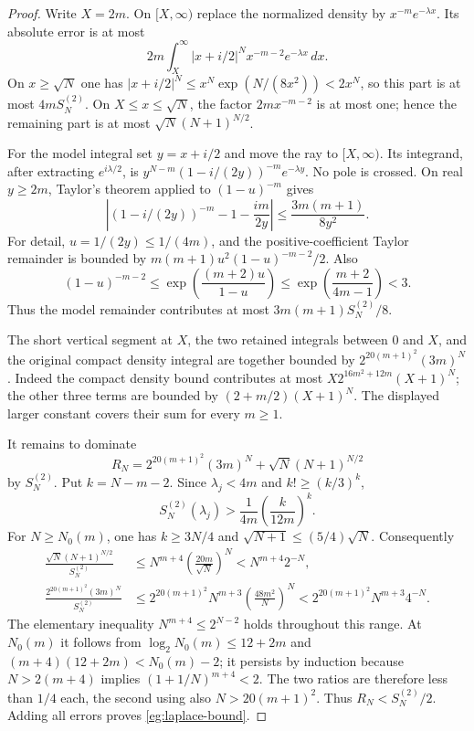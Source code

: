 \documentclass[11pt,a4paper]{article}
\numberwithin{equation}{section}
\theoremstyle{definition}
\theoremstyle{remark}
\begin{document}
\begin{proof}
Write $X=2m$.  On $[X,\infty)$ replace the normalized density
by $x^{-m}e^{-\lambda x}$.  Its absolute error is at most
\[
 2m\int_X^\infty |x+i/2|^Nx^{-m-2}e^{-\lambda x}\,dx.
\]
On $x\ge\sqrt N$ one has
$|x+i/2|^N\le x^N\exp(N/(8x^2))<2x^N$, so this part is
at most $4mS_N^{(2)}$.  On $X\le x\le\sqrt N$, the factor
$2mx^{-m-2}$ is at most one; hence the remaining part is at most
$\sqrt N(N+1)^{N/2}$.

For the model integral set $y=x+i/2$ and move the ray to
$[X,\infty)$.  Its integrand, after extracting $e^{i\lambda/2}$,
is $y^{N-m}(1-i/(2y))^{-m}e^{-\lambda y}$.  No pole is crossed.
On real $y\ge2m$, Taylor's theorem applied to $(1-u)^{-m}$ gives
\[
 \left|(1-i/(2y))^{-m}-1-\frac{im}{2y}\right|
       \le\frac{3m(m+1)}{8y^2}.
\]
For detail, $u=1/(2y)\le1/(4m)$, and the positive-coefficient
Taylor remainder is bounded by
$m(m+1)u^2(1-u)^{-m-2}/2$.  Also
\[
 (1-u)^{-m-2}\le
  \exp\!\left(\frac{(m+2)u}{1-u}\right)
  \le\exp\!\left(\frac{m+2}{4m-1}\right)<3.
\]
Thus the model remainder contributes at most
$3m(m+1)S_N^{(2)}/8$.

The short vertical segment at $X$, the two retained integrals
between $0$ and $X$, and the original compact density integral
are together bounded by $2^{20(m+1)^2}(3m)^N$.  Indeed the
compact density bound contributes at most
$X2^{16m^2+12m}(X+1)^N$; the other three terms are bounded
by $(2+m/2)(X+1)^N$.  The displayed larger constant covers their
sum for every $m\ge1$.

It remains to dominate
\[
 R_N=2^{20(m+1)^2}(3m)^N+\sqrt N(N+1)^{N/2}
\]
by $S_N^{(2)}$.  Put $k=N-m-2$.  Since $\lambda_j<4m$ and
$k!\ge(k/3)^k$,
\[
 S_N^{(2)}(\lambda_j)>
             \frac1{4m}\left(\frac{k}{12m}\right)^k.
\]
For $N\ge N_0(m)$, one has $k\ge3N/4$ and
$\sqrt{N+1}\le(5/4)\sqrt N$.  Consequently
\begin{align*}
 \frac{\sqrt N(N+1)^{N/2}}{S_N^{(2)}}
  &\le N^{m+4}\left(\frac{20m}{\sqrt N}\right)^N
    <N^{m+4}2^{-N},\\
 \frac{2^{20(m+1)^2}(3m)^N}{S_N^{(2)}}
  &\le2^{20(m+1)^2}N^{m+3}
                \left(\frac{48m^2}{N}\right)^N
    <2^{20(m+1)^2}N^{m+3}4^{-N}.
\end{align*}
The elementary inequality $N^{m+4}\le2^{N-2}$ holds throughout
this range.  At $N_0(m)$ it follows from
$\log_2N_0(m)\le12+2m$ and
$(m+4)(12+2m)<N_0(m)-2$; it persists by induction because
$N>2(m+4)$ implies $(1+1/N)^{m+4}<2$.
The two ratios are therefore less than $1/4$ each, the second
using also $N>20(m+1)^2$.  Thus $R_N<S_N^{(2)}/2$.
Adding all errors proves \eqref{eg:laplace-bound}.
\end{proof}
\end{document}
